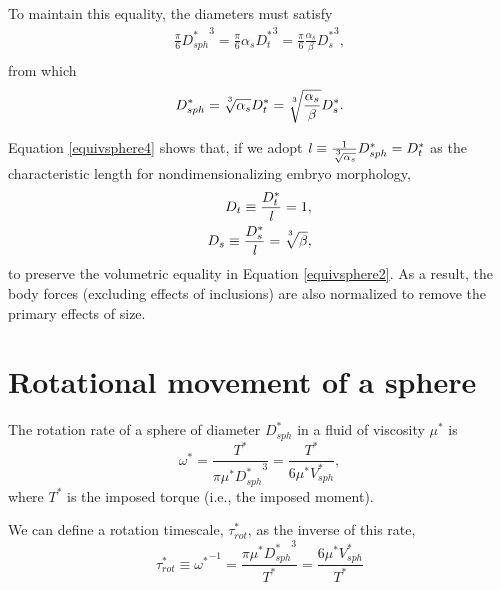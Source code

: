 \documentclass[10pt,a4paper]{article}
\def\non{\nonumber}
\begin{document}
To maintain this equality, the diameters must satisfy
\begin{eqnarray}\label{equivsphere3}
	\frac{\pi}{6} {D_{sph}^*}^3 = \frac{\pi}{6} \alpha_s {D_t^*}^3  = \frac{\pi}{6} \frac{\alpha_s}{\beta} {D_s^*}^3, \non \\
\end{eqnarray} 
from which
\begin{eqnarray}\label{equivsphere4}
	D_{sph}^* = \sqrt[\uproot{5}3]{\alpha_s} D_t^* = \sqrt[\uproot{5}3]{\frac{\alpha_s}{\beta}} D_s^*.
\end{eqnarray} 

Equation \ref{equivsphere4} shows that, if we adopt $\mathit{l} \equiv \frac{1}{\sqrt[\uproot{5}3]{\alpha_s}} D_{sph}^* = D_t^*$ as the characteristic length for nondimensionalizing embryo morphology,
\begin{eqnarray}\label{ndD}
	D_t \equiv \frac{D_t^*}{\mathit{l}}  = 1, \non \\
	D_s \equiv \frac{D_s^*}{\mathit{l}} = \sqrt[\uproot{5}3]{\beta},
\end{eqnarray} 
to preserve the volumetric equality in Equation \ref{equivsphere2}.
As a result, the body forces (excluding effects of inclusions) are also normalized to remove the primary effects of size.

\section{Rotational movement of a sphere}\label{RotSect}
The rotation rate of a sphere of diameter $D_{sph}^*$ in a fluid of viscosity $\mu^*$ is 
\begin{equation}\label{rot1}
	\omega^* = \frac{T^*}{\pi \mu^* {D_{sph}^*}^3} = \frac{T^*}{6 \mu^* V_{sph}^*},	
\end{equation}
where $T^*$ is the imposed torque (i.e., the imposed moment).

We can define a rotation timescale, $\tau^*_{rot}$, as the inverse of this rate,
\begin{equation}\label{tau1}
	\tau^*_{rot} \equiv {\omega^*}^{-1} = \frac{\pi \mu^* {D_{sph}^*}^3}{T^*} = \frac{6 \mu^* V_{sph}^*}{T^*}
\end{equation}
\end{document}
